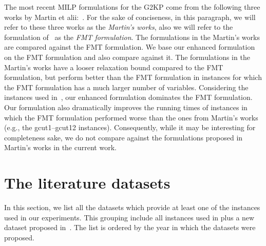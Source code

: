 \documentclass[ppgc,prop-tese,english,formais,babel]{iiufrgs}
\begin{document}
The most recent MILP formulations for the G2KP come from the following three works by Martin et alii:~\citet{martin:2020:models,martin:2020:bottom,martin:2020:top}.
For the sake of conciseness, in this paragraph, we will refer to these three works as the \emph{Martin's works}, also we will refer to the formulation of~\citet{furini:2016} as the \emph{FMT formulation}.
The formulations in the Martin's works are compared against the FMT formulation.
We base our enhanced formulation on the FMT formulation and also compare against it.
The formulations in the Martin's works have a looser relaxation bound compared to the FMT formulation, but perform better than the FMT formulation in instances for which the FMT formulation has a much larger number of variables.
Considering the instances used in~\citet{furini:2016}, our enhanced formulation dominates the FMT formulation.
Our formulation also dramatically improves the running times of instances in which the FMT formulation performed worse than the ones from Martin's works (e.g., the gcut1--gcut12 instances).
Consequently, while it may be interesting for completeness sake, we do not compare against the formulations proposed in Martin's works in the current work.


\section{The literature datasets}
\label{sec:datasets}

In this section, we list all the datasets which provide at least one of the instances used in our experiments.
This grouping include all instances used in \citet{furini:2016} plus a new dataset proposed in~\citet{velasco:2019}.
The list is ordered by the year in which the datasets were proposed.

\end{document}

